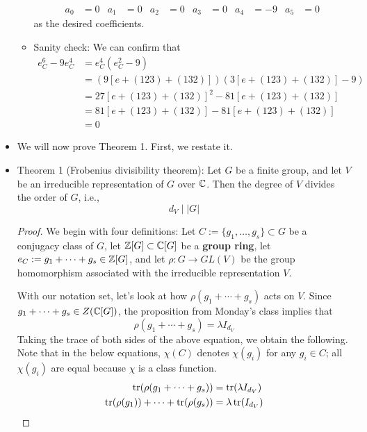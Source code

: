 \documentclass[../notes.tex]{subfiles}
\begin{document}
\begin{itemize}
\begin{itemize}
\begin{align*}
            a_0 &= 0&
            a_1 &= 0&
            a_2 &= 0&
            a_3 &= 0&
            a_4 &= -9&
            a_5 &= 0
        \end{align*}
        as the desired coefficients.
        \item Sanity check: We can confirm that
        \begin{align*}
            e_C^6-9e_C^4 &= e_C^4(e_C^2-9)\\
            &= (9[e+(123)+(132)])(3[e+(123)+(132)]-9)\\
            &= 27[e+(123)+(132)]^2-81[e+(123)+(132)]\\
            &= 81[e+(123)+(132)]-81[e+(123)+(132)]\\
            &= 0
        \end{align*}
    \end{itemize}
    \item We will now prove Theorem 1. First, we restate it.
    \item Theorem 1 (Frobenius divisibility theorem): Let $G$ be a finite group, and let $V$ be an irreducible representation of $G$ over $\mathbb{C}$. Then the degree of $V$ divides the order of $G$, i.e.,
    \begin{equation*}
        d_V \mid |G|
    \end{equation*}
    \begin{proof}
        We begin with four definitions: Let $C:=\{g_1,\dots,g_s\}\subset G$ be a conjugacy class of $G$, let $\mathbb{Z}[G]\subset\mathbb{C}[G]$ be a \textbf{group ring}, let $e_C:=g_1+\cdots+g_s\in\mathbb{Z}[G]$, and let $\rho:G\to GL(V)$ be the group homomorphism associated with the irreducible representation $V$.\par
        With our notation set, let's look at how $\rho(g_1+\cdots+g_s)$ acts on $V$. Since $g_1+\cdots+g_s\in Z(\mathbb{C}[G])$, the proposition from Monday's class implies that
        \begin{equation*}
            \rho(g_1+\cdots+g_s) = \lambda I_{d_V}
        \end{equation*}
        Taking the trace of both sides of the above equation, we obtain the following. Note that in the below equations, $\chi(C)$ denotes $\chi(g_i)$ for any $g_i\in C$; all $\chi(g_i)$ are equal because $\chi$ is a class function. 
        \begin{align*}
            \tr(\rho(g_1+\cdots+g_s)) &= \tr(\lambda I_{d_V})\\
            \tr(\rho(g_1))+\cdots+\tr(\rho(g_s)) &= \lambda\tr(I_{d_V})\\

\end{align*}
\end{proof}
\end{itemize}
\end{document}
